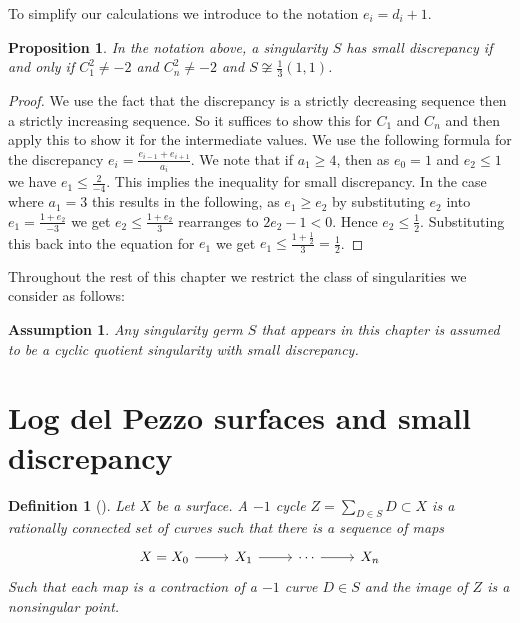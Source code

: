 \documentclass[12pt]{amsbook}
\theoremstyle{plain}
\newtheorem{prop}[thm]{Proposition}
\newtheorem{dfn}[thm]{Definition}
\newtheorem{assumption}[thm]{Assumption}
\begin{document}
To simplify our calculations we introduce to the notation $e_i = d_i + 1$. 

\begin{prop}
In the notation above,
a singularity $S$ has small discrepancy if and only if $C_1^2 \neq -2$ and $C_n^2 \neq -2$ and $ S \not\cong \frac{1}{3}(1,1)$.
\end{prop}
\begin{proof}
 We use the fact that the discrepancy is a strictly decreasing sequence then a strictly increasing sequence. So it suffices to show this for $C_1$ and $C_n$ and then apply this to show it for the intermediate values. We use the following formula for the discrepancy $e_i =  \frac{e_{i-1}+e_{i+1}}{a_i}$. We note that if $a_1 \geq 4$, then as $e_0 = 1$ and $e_2 \leq 1$ we have $e_1 \leq \frac{2}{-4}$. This implies the inequality for small discrepancy. In the case where $a_1 = 3$ this results in the following, as $e_1 \geq e_2$ by substituting $e_2$ into $e_1 = \frac{1 + e_2}{-3}$ we get  $ e_2 \leq \frac{1 + e_2}{3}$ rearranges to $2e_2 - 1 < 0$. Hence $e_2 \leq \frac{1}{2}$. Substituting this back into the equation for $e_1$ we get $e_1 \leq  \frac{1+ \frac{1}{2}}{3} =  \frac{1}{2}$. 
 \end{proof}


Throughout the rest of this chapter we restrict the class of singularities we consider as follows:

\begin{assumption}
Any singularity germ $S$ that appears in this chapter is assumed to be a cyclic
quotient singularity with small discrepancy.
\end{assumption}

\section{Log del Pezzo surfaces and small discrepancy}

\begin{dfn}[\cite{Artin}]
Let $X$ be a surface. A $-1$ cycle $Z = \sum_{D \in S} D \subset X$ is a rationally connected set of curves such that there is a sequence of maps 
\[
\begin{tikzcd}
X=X_0 \arrow[r] & X_1 \arrow[r] & \cdots \arrow[r] & X_n
\end{tikzcd}
\]
Such that each map is a contraction of a $-1$ curve $D \in S$ and the image of $Z$ is a nonsingular point.
\end{dfn}
\end{document}
